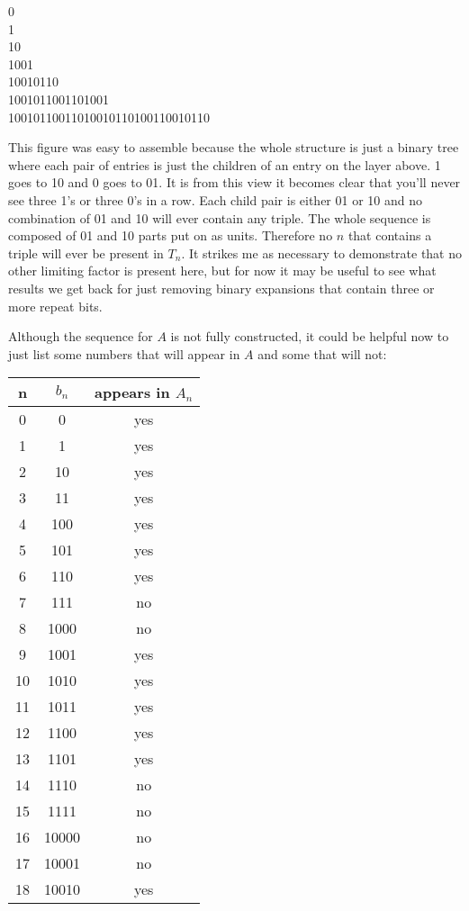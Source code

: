 \documentclass{article}
\begin{document}
\begin{center}
    0 \\
    1 \\
    10 \\
    1001 \\
    10010110 \\
    1001011001101001 \\
    10010110011010010110100110010110 \\
\end{center}

This figure was easy to assemble because the whole structure is just a binary tree where each pair of entries is just the children of an entry on the layer above.  1 goes to 10 and 0 goes to 01.  It is from this view it becomes clear that you'll never see three 1's or three 0's in a row.  Each child pair is either 01 or 10 and no combination of 01 and 10 will ever contain any triple.  The whole sequence is composed of 01 and 10 parts put on as units.  Therefore no $n$ that contains a triple will ever be present in $T_n$.  It strikes me as necessary to demonstrate that no other limiting factor is present here, but for now it may be useful to see what results we get back for just removing binary expansions that contain three or more repeat bits.

\par

Although the sequence for $A$ is not fully constructed, it could be helpful now to just list some numbers that will appear in $A$ and some that will not:

\begin{center}
    \begin{tabular}{c | c | c}
        n & $b_{n}$ & appears in $A_n$ \\
        \hline
        0 & 0 & yes \\
        1 & 1 & yes \\
        2 & 10 & yes \\
        3 & 11 & yes \\
        4 & 100 & yes \\
        5 & 101 & yes \\
        6 & 110 & yes \\
        7 & 111 & no \\
        8 & 1000 & no \\
        9 & 1001 & yes \\
        10 & 1010 & yes \\
        11 & 1011 & yes \\
        12 & 1100 & yes \\
        13 & 1101 & yes \\
        14 & 1110 & no \\
        15 & 1111 & no \\
        16 & 10000 & no \\
        17 & 10001 & no \\
        18 & 10010 & yes \\
    \end{tabular}
\end{center}
\end{document}
